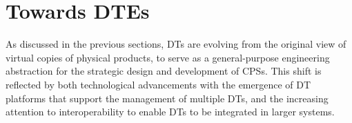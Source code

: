 %



\section{Towards \aclp{DTE}}

As discussed in the previous sections, \acp{DT} are evolving from the original view of virtual copies of physical products, to serve as a general-purpose engineering abstraction for the strategic design and development of \acp{CPS}.
%
This shift is reflected by both technological advancements with the emergence of \ac{DT} platforms that support the management of multiple \acp{DT}, and the increasing attention to interoperability to enable \acp{DT} to be integrated in larger systems.



